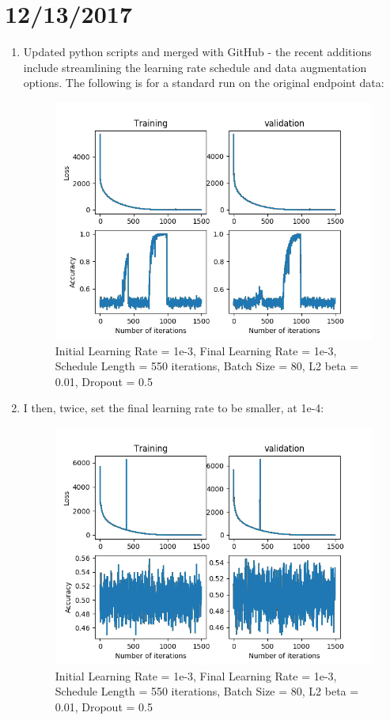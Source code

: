 \documentclass[12pt,reqno]{amsart}
\numberwithin{equation}{section}
\begin{document}
\section{12/13/2017}
\begin{enumerate}
\item Updated python scripts and merged with GitHub - the recent additions include streamlining the learning rate schedule and data augmentation options.  The following is for a standard run on the original endpoint data:

\begin{figure}[H]
\centering
\includegraphics[scale=0.6]{test-1e-3-1e-3-550-80-1e-2-5e-1}
\caption{Initial Learning Rate = 1e-3, Final Learning Rate = 1e-3, Schedule Length = 550 iterations, Batch Size = 80, L2 beta = 0.01, Dropout = 0.5}
\end{figure}

\item I then, twice, set the final learning rate to be smaller, at 1e-4:

\begin{figure}[H]
\centering
\includegraphics[scale=0.6]{test-1e-4-1e-3-550-80-1e-2-5e-1}
\caption{Initial Learning Rate = 1e-3, Final Learning Rate = 1e-3, Schedule Length = 550 iterations, Batch Size = 80, L2 beta = 0.01, Dropout = 0.5}
\end{figure}


\end{enumerate}
\end{document}

